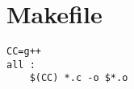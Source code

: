 \section{Makefile}
\begin{lstlisting}[label=set code,caption=Some Code]
CC=g++
all :
    $(CC) *.c -o $*.o
\end{lstlisting}
